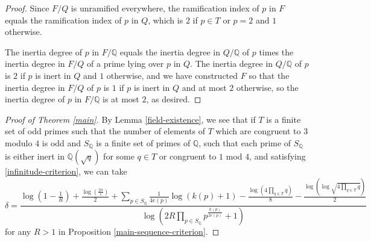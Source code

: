 \documentclass[12pt]{amsart}
\theoremstyle{remark}
\theoremstyle{definition}
\begin{document}
\begin{proof}
Since $F/Q$ is unramified everywhere, the ramification index of $p$ in $F$ equals the ramification index of $p$ in $Q$, which is $2$ if $p\in T$ or $p=2$ and $1$ otherwise.

The inertia degree of $p$ in $F/\mathbb Q$ equals the inertia degree in $Q/\mathbb Q$ of $p$ times the inertia degree in $F/Q$ of a prime lying over $p$ in $Q$. The inertia degree in $Q/\mathbb Q$ of $p$ is $2$ if $p$ is inert in $Q$ and $1$ otherwise, and we have constructed $F$ so that the inertia degree in $F/Q$ of $p$ is $1$ if $p$ is inert in $Q$ and at most $2$ otherwise, so the inertia degree of $p$ in $F/\mathbb Q$ is at most $2$, as desired. \end{proof}



\begin{proof}[Proof of Theorem \ref{main}]

By Lemma \ref{field-existence}, we see that if $T$ is a finite set of odd  primes such that the number of elements of $T$ which are congruent to $3$ modulo $4$ is odd and $S_{\mathbb Q}$ is a finite set of primes of $\mathbb Q$, such that each prime of $S_{\mathbb Q}$ is either inert in $\mathbb Q(\sqrt{q})$ for some $q\in T$ or congruent to $1$ mod $4$, and satisfying \eqref{infinitude-criterion}, we can take
\begin{equation}\label{delta-specialized} \delta=  \frac{  \log \left(1-\frac{1}{R}\right) + \frac{\log \left(\frac{2\pi}{e} \right)}{2} +\sum_{p\in S_{\mathbb Q}} \frac{1}{4e(p) } \log (k(p)+1)  - \frac{\log (4 \prod_{q\in T}q )}{8} -\frac{\log( \log \sqrt{4 \prod_{q\in T}q})}{2} }{ \log \left( 2R \prod_{p \in S_\mathbb Q} p^{\frac{k(p) }{2e(p)}} +1 \right)}\end{equation}
for any $R>1$ in Proposition \ref{main-sequence-criterion}. 


\end{proof}
\end{document}
